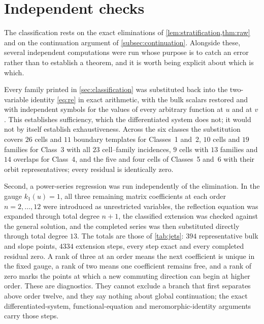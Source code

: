\documentclass[11pt,reqno]{amsart}
\theoremstyle{plain}
\theoremstyle{definition}
\theoremstyle{remark}
\numberwithin{equation}{section}
\begin{document}
\section{Independent checks}
\label{sec:checks}

The classification rests on the exact eliminations of
\cref{lem:stratification,thm:raw} and on the continuation argument of
\cref{subsec:continuation}. Alongside these, several independent computations
were run whose purpose is to catch an error rather than to establish a theorem,
and it is worth being explicit about which is which.

Every family printed in \cref{sec:classification} was substituted back into the
two-variable identity \cref{eq:re} in exact arithmetic, with the bulk scalars
restored and with independent symbols for the values of every arbitrary function
at $u$ and at $v$. This establishes sufficiency, which the differentiated system
does not; it would not by itself establish exhaustiveness. Across the six classes
the substitution covers $26$ cells and $11$ boundary templates for Classes~1
and~2, $10$ cells and $19$ families for Class~3 with all $23$ cell--family
incidences, $9$ cells with $13$ families and $14$ overlaps for Class~4, and the
five and four cells of Classes~5 and~6 with their orbit representatives; every
residual is identically zero.

Second, a power-series regression was run independently of the elimination. In
the gauge $k_1(u)=1$, all three remaining matrix coefficients at each order
$n=2,\dots,12$ were introduced as unrestricted variables, the reflection equation
was expanded through total degree $n+1$, the classified extension was checked
against the general solution, and the completed series was then substituted
directly through total degree $13$. The totals are those of \cref{tab:jets}: $394$
representative bulk and slope points, $4334$ extension steps, every step exact and
every completed residual zero. A rank of three at an order means the next
coefficient is unique in the fixed gauge, a rank of two means one coefficient
remains free, and a rank of zero marks the points at which a new commuting
direction can begin at higher order. These are diagnostics. They cannot exclude a
branch that first separates above order twelve, and they say nothing about global
continuation; the exact differentiated-system, functional-equation and
meromorphic-identity arguments carry those steps.
\end{document}
